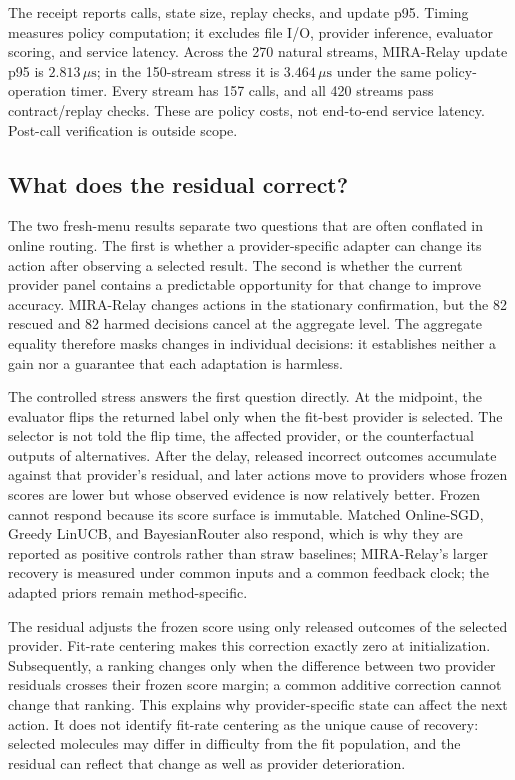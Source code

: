 \documentclass[sigconf,anonymous]{aamas}
\begin{document}
The receipt reports calls, state size, replay checks, and update p95. Timing measures policy computation; it excludes file I/O, provider inference, evaluator scoring, and service latency. Across the 270 natural streams, MIRA-Relay update p95 is $2.813\,\mu\mathrm{s}$; in the 150-stream stress it is $3.464\,\mu\mathrm{s}$ under the same policy-operation timer. Every stream has 157 calls, and all 420 streams pass contract/replay checks. These are policy costs, not end-to-end service latency. Post-call verification is outside scope.

\subsection{What does the residual correct?}
The two fresh-menu results separate two questions that are often conflated in online routing. The first is whether a provider-specific adapter can change its action after observing a selected result. The second is whether the current provider panel contains a predictable opportunity for that change to improve accuracy. MIRA-Relay changes actions in the stationary confirmation, but the 82 rescued and 82 harmed decisions cancel at the aggregate level. The aggregate equality therefore masks changes in individual decisions: it establishes neither a gain nor a guarantee that each adaptation is harmless.

The controlled stress answers the first question directly. At the midpoint, the evaluator flips the returned label only when the fit-best provider is selected. The selector is not told the flip time, the affected provider, or the counterfactual outputs of alternatives. After the delay, released incorrect outcomes accumulate against that provider's residual, and later actions move to providers whose frozen scores are lower but whose observed evidence is now relatively better. Frozen cannot respond because its score surface is immutable. Matched Online-SGD, Greedy LinUCB, and BayesianRouter also respond, which is why they are reported as positive controls rather than straw baselines; MIRA-Relay's larger recovery is measured under common inputs and a common feedback clock; the adapted priors remain method-specific.

The residual adjusts the frozen score using only released outcomes of the selected provider. Fit-rate centering makes this correction exactly zero at initialization. Subsequently, a ranking changes only when the difference between two provider residuals crosses their frozen score margin; a common additive correction cannot change that ranking. This explains why provider-specific state can affect the next action. It does not identify fit-rate centering as the unique cause of recovery: selected molecules may differ in difficulty from the fit population, and the residual can reflect that change as well as provider deterioration.
\end{document}
